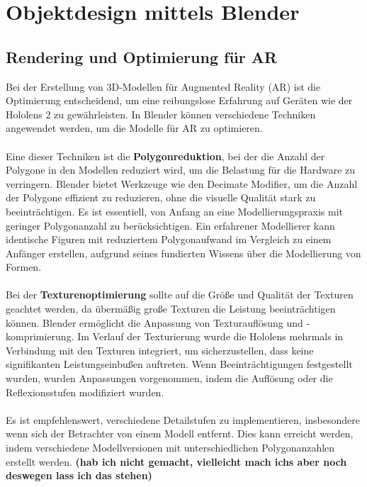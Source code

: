 \section{Objektdesign mittels Blender}
\subsection{Rendering und Optimierung für AR}
Bei der Erstellung von 3D-Modellen für Augmented Reality (AR) ist die Optimierung entscheidend, um eine reibungslose
Erfahrung auf Geräten wie der Hololens 2 zu gewährleisten. In Blender können verschiedene Techniken angewendet werden,
um die Modelle für AR zu optimieren.\\
\\
Eine dieser Techniken ist die \textbf{Polygonreduktion}, bei der die Anzahl der Polygone in den Modellen reduziert wird, um die
Belastung für die Hardware zu verringern. Blender bietet Werkzeuge wie den Decimate Modifier, um die Anzahl der Polygone
effizient zu reduzieren, ohne die visuelle Qualität stark zu beeinträchtigen. Es ist essentiell, von Anfang an eine
Modellierungspraxis mit geringer Polygonanzahl zu berücksichtigen. Ein erfahrener Modellierer kann identische Figuren
mit reduziertem Polygonaufwand im Vergleich zu einem Anfänger erstellen, aufgrund seines fundierten Wissens über die
Modellierung von Formen.\\
\\
Bei der \textbf{Texturenoptimierung} sollte auf die Größe und Qualität der Texturen geachtet werden, da übermäßig große Texturen
die Leistung beeinträchtigen können. Blender ermöglicht die Anpassung von Texturauflösung und -komprimierung. Im Verlauf
der Texturierung wurde die Hololens mehrmals in Verbindung mit den Texturen integriert, um sicherzustellen, dass keine
signifikanten Leistungseinbußen auftreten. Wenn Beeinträchtigungen festgestellt wurden, wurden Anpassungen vorgenommen,
indem die Auflösung oder die Reflexionsstufen modifiziert wurden.\\
\\
Es ist empfehlenswert, verschiedene Detailstufen zu implementieren, insbesondere wenn sich der Betrachter von einem
Modell entfernt. Dies kann erreicht werden, indem verschiedene Modellversionen mit unterschiedlichen Polygonanzahlen
erstellt werden. \textbf{(hab ich nicht gemacht, vielleicht mach ichs aber noch deswegen lass ich das stehen)}

